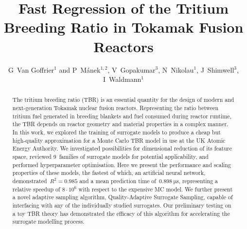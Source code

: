 \documentclass[12pt]{iopart}
\begin{document}

\title[Fast Regression of the Tritium Breeding Ratio in Tokamaks]{Fast Regression of the
Tritium Breeding Ratio in Tokamak Fusion Reactors} %

\author{G~Van Goffrier$^1$ and P~Mánek$^{1,2}$, V~Gopakumar$^3$, N~Nikolau$^1$, J~Shimwell$^3$, I~Waldmann$^1$}

\address{$^1$ Department of Physics and Astronomy, University College London, Gower Street, London WC1E~6BT, UK}
\address{$^2$ Institute of Experimental and Applied Physics, Czech Technical University, Husova 240/5, Prague 110~00, Czech Republic}
\address{$^3$ UK Atomic Energy Authority, Culham Science Centre, OX14~3DB Abingdon, UK}


\begin{abstract}
	The tritium breeding ratio (TBR) is an essential quantity for the design of
	modern and next-generation Tokamak nuclear fusion reactors. Representing the
	ratio between tritium fuel generated in breeding blankets and fuel consumed
	during reactor runtime, the TBR depends on reactor geometry and material
	properties in a complex manner. In this work, we explored the
	training of surrogate models to produce a cheap but high-quality approximation
	for a Monte Carlo TBR model in use at the UK Atomic Energy Authority. We
	investigated possibilities for dimensional reduction of its feature space, reviewed
	9~families of surrogate models for potential
	applicability, and performed hyperparameter optimisation. Here we present the
	performance and scaling properties of these
	models, the fastest of which, an artificial neural network,
	demonstrated~$R^2=\num{0.985}$ and a mean
	prediction time of~$\SI{0.898}{\micro\second}$, representing a relative speedup of $8\cdot 10^6$
	with respect to the expensive MC model. We further present a novel adaptive
	sampling algorithm, Quality-Adaptive Surrogate Sampling, capable
	of interfacing with any of the individually studied surrogates. Our preliminary
	testing on a toy TBR theory has demonstrated the efficacy of this algorithm for
	accelerating the surrogate modelling process.
\end{abstract}
\end{document}
